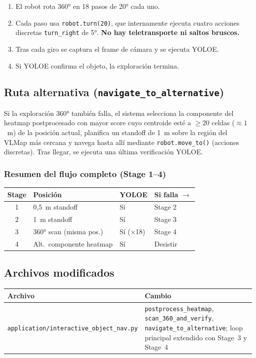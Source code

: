 \documentclass[11pt,a4paper]{article}
\begin{document}
\begin{enumerate}
  \item El robot rota $360°$ en 18 pasos de 20° cada uno.
  \item Cada paso usa \texttt{robot.turn(20)}, que internamente ejecuta
        cuatro acciones discretas \texttt{turn\_right} de 5°.
        \textbf{No hay teletransporte ni saltos bruscos.}
  \item Tras cada giro se captura el frame de cámara y se ejecuta YOLOE.
  \item Si YOLOE confirma el objeto, la exploración termina.
\end{enumerate}

\subsection{Ruta alternativa (\texttt{navigate\_to\_alternative})}

Si la exploración 360° también falla, el sistema selecciona la componente
del heatmap postprocesado con mayor score cuyo centroide esté a
$\geq20$ celdas (${\approx}1$~m) de la posición actual, planifica un standoff de
1~m sobre la región del VLMap más cercana y navega hasta allí mediante
\texttt{robot.move\_to()} (acciones discretas). Tras llegar, se ejecuta
una última verificación YOLOE.

\subsubsection*{Resumen del flujo completo (Stage 1--4)}

\begin{center}
\begin{tabular}{clll}
\toprule
Stage & Posición & YOLOE & Si falla $\to$ \\
\midrule
1 & 0{,}5~m standoff & Sí & Stage 2 \\
2 & 1~m standoff     & Sí & Stage 3 \\
3 & 360° scan (misma pos.) & Sí ($\times$18) & Stage 4 \\
4 & Alt.\ componente heatmap & Sí & Desistir \\
\bottomrule
\end{tabular}
\end{center}

\subsection{Archivos modificados}

\begin{center}
\begin{tabular}{ll}
\toprule
\textbf{Archivo} & \textbf{Cambio} \\
\midrule
\texttt{application/interactive\_object\_nav.py}
  & \texttt{postprocess\_heatmap}, \texttt{scan\_360\_and\_verify},
    \texttt{navigate\_to\_alternative}; loop principal extendido con
    Stage~3 y Stage~4 \\
\bottomrule
\end{tabular}
\end{center}
\end{document}
